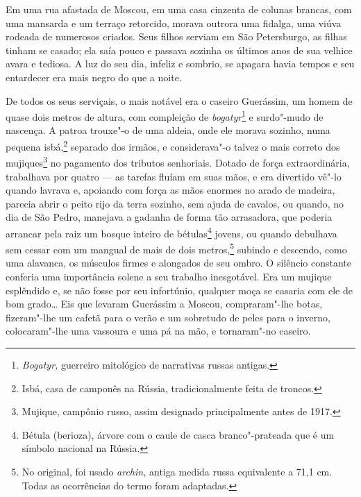 Em uma rua afastada de Moscou, em uma casa cinzenta de colunas brancas,
com uma mansarda e um terraço retorcido, morava outrora uma fidalga, uma
viúva rodeada de numerosos criados. Seus filhos serviam em São
Petersburgo, as filhas tinham se casado; ela saía pouco e passava
sozinha os últimos anos de sua velhice avara e tediosa. A luz do seu
dia, infeliz e sombrio, se apagara havia tempos e seu entardecer era
mais negro do que a noite.

De todos os seus serviçais, o mais notável era o caseiro Guerássim, um
homem de quase dois metros de altura, com compleição de
\emph{bogatyr}\footnote{\emph{Bogatyr,} guerreiro mitológico de
  narrativas russas antigas.} e surdo"-mudo de nascença. A patroa
trouxe"-o de uma aldeia, onde ele morava sozinho, numa pequena
isbá,\footnote{Isbá, casa de camponês na Rússia, tradicionalmente
  feita de troncos.} separado dos irmãos, e considerava"-o talvez o mais
correto dos mujiques\footnote{Mujique, campônio russo, assim designado
  principalmente antes de 1917.} no pagamento dos tributos senhoriais.
Dotado de força extraordinária, trabalhava por quatro --- as tarefas
fluíam em suas mãos, e era divertido vê"-lo quando lavrava e, apoiando
com força as mãos enormes no arado de madeira, parecia abrir o peito
rijo da terra sozinho, sem ajuda de cavalos, ou quando, no dia de São
Pedro, manejava a gadanha de forma tão arrasadora, que poderia arrancar
pela raiz um bosque inteiro de bétulas\footnote{Bétula (berioza), árvore
  com o caule de casca branco"-prateada que é um símbolo nacional na
  Rússia.} jovens, ou quando debulhava sem cessar com um mangual de mais
de dois metros,\footnote{No original, foi usado \emph{archin,} antiga
  medida russa equivalente a 71,1 cm. Todas as ocorrências do termo
  foram adaptadas.} subindo e descendo, como uma alavanca, os músculos
firmes e alongados de seu ombro. O silêncio constante conferia uma
importância solene a seu trabalho inesgotável. Era um mujique esplêndido
e, se não fosse por seu infortúnio, qualquer moça se casaria com ele de
bom grado\ldots{} Eis que levaram Guerássim a Moscou, compraram"-lhe botas,
fizeram"-lhe um cafetã para o verão e um sobretudo de peles para o
inverno, colocaram"-lhe uma vassoura e uma pá na mão, e tornaram"-no
caseiro.

